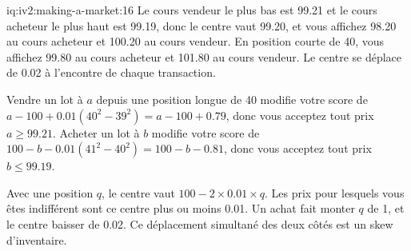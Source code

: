 \begin{solution}{iq:iv2:making-a-market:16}
Le cours vendeur le plus bas est 99.21 et le cours acheteur le plus haut est 99.19, donc le centre vaut 99.20, et vous affichez 98.20 au cours acheteur et 100.20 au cours vendeur. En position courte de 40, vous affichez 99.80 au cours acheteur et 101.80 au cours vendeur. Le centre se déplace de 0.02 à l'encontre de chaque transaction.

Vendre un lot à $a$ depuis une position longue de 40 modifie votre score de $a - 100 + 0.01(40^2 - 39^2) = a - 100 + 0.79$, donc vous acceptez tout prix $a \ge 99.21$. Acheter un lot à $b$ modifie votre score de $100 - b - 0.01(41^2 - 40^2) = 100 - b - 0.81$, donc vous acceptez tout prix $b \le 99.19$.

Avec une position $q$, le centre vaut $100 - 2 \times 0.01 \times q$. Les prix pour lesquels vous êtes indifférent sont ce centre plus ou moins 0.01. Un achat fait monter $q$ de 1, et le centre baisser de 0.02. Ce déplacement simultané des deux côtés est un skew d'inventaire.

\end{solution}

